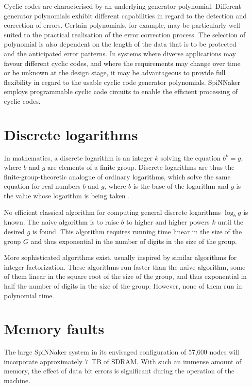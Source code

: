 \documentclass[oneside, a4paper, 11pt]{memoir}
\begin{document}
Cyclic codes are characterised by an underlying generator polynomial. Different generator polynomials exhibit different capabilities in regard to the detection and correction of errors. Certain polynomials, for example, may be particularly well suited to the practical realisation of the error correction process. The selection of polynomial is also dependent on the length of the data that is to be protected and the anticipated error patterns. In systems where diverse applications may favour different cyclic codes, and where the requirements may change over time or be unknown at the design stage, it may be advantageous to provide full flexibility in regard to the usable cyclic code generator polynomials. SpiNNaker employs programmable cyclic code circuits to enable the efficient processing of cyclic codes.

\section{Discrete logarithms}
In mathematics, a discrete logarithm is an integer $k$ solving the equation $b^k = g$, where $b$ and $g$ are elements of a finite group. Discrete logarithms are thus the finite-group-theoretic analogue of ordinary logarithms, which solve the same equation for real numbers $b$ and $g$, where $b$ is the base of the logarithm and $g$ is the value whose logarithm is being taken \citep{wiki:discretelogs}.

No efficient classical algorithm for computing general discrete logarithms $\log _b g$ is known. The naive algorithm is to raise $b$ to higher and higher powers $k$ until the desired $g$ is found. This algorithm requires running time linear in the size of the group $G$ and thus exponential in the number of digits in the size of the group.

More sophisticated algorithms exist, usually inspired by similar algorithms for integer factorization. These algorithms run faster than the naive algorithm, some of them linear in the square root of the size of the group, and thus exponential in half the number of digits in the size of the group. However, none of them run in polynomial time.

\section{Memory faults}
The large SpiNNaker system in its envisaged configuration of 57,600 nodes will incorporate approximately 7~TB of SDRAM. With such an immense amount of memory, the effect of data bit errors is significant during the operation of the machine.
\end{document}
